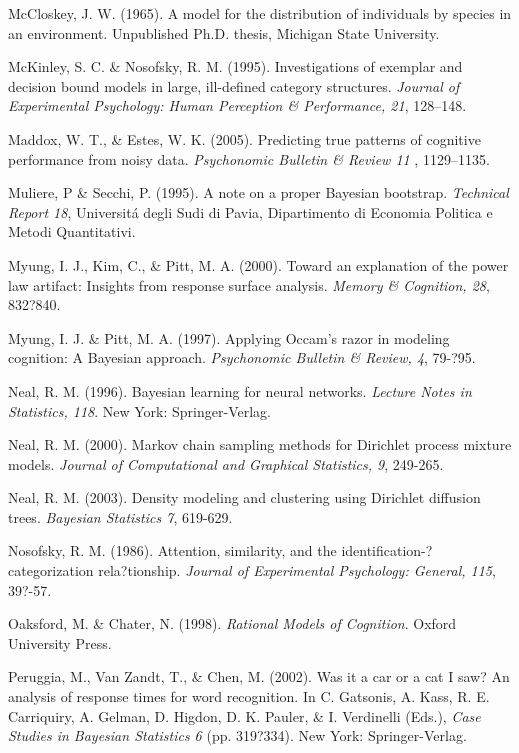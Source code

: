 \documentclass[authoryear]{elsarticle}
\begin{document}
\begin{list}{}{\setlength{\leftmargin}{12pt}\setlength{\itemindent}{-12pt}\setlength{\parsep}{0pt}}
\item McCloskey, J. W. (1965). A model for the distribution of individuals by species in an environment. Unpublished Ph.D. thesis, Michigan State University.
\item McKinley, S. C. \& Nosofsky, R. M. (1995). Investigations of exemplar and decision bound models in large, ill-defined category structures. {\it Journal of Experimental Psychology: Human Perception \& Performance, 21}, 128--148.
\item Maddox, W. T., \& Estes, W. K. (2005). Predicting true patterns of cognitive performance from noisy data. {\it Psychonomic Bulletin \& Review 11} , 1129--1135.
\item Muliere, P \& Secchi, P. (1995). A note on a proper Bayesian bootstrap. {\it Technical Report 18}, Universit\'{a} degli Sudi di Pavia, Dipartimento di Economia Politica e Metodi Quantitativi.
\item Myung, I. J., Kim, C., \& Pitt, M. A. (2000). Toward an explanation of the power law artifact: Insights from response surface analysis. {\it Memory \& Cognition, 28}, 832?840.
\item Myung, I. J. \& Pitt, M. A. (1997). Applying Occam's razor in modeling cognition: A Bayesian approach. {\it Psychonomic Bulletin \& Review, 4}, 79-?95.
\item Neal, R. M. (1996). Bayesian learning for neural networks. {\it Lecture Notes in Statistics, 118}. New York: Springer-Verlag.
\item Neal, R. M. (2000). Markov chain sampling methods for Dirichlet process mixture models. {\it Journal of Computational and Graphical Statistics, 9}, 249-265.
\item Neal, R. M. (2003). Density modeling and clustering using Dirichlet diffusion trees. {\it Bayesian Statistics 7}, 619-629.
\item Nosofsky, R. M. (1986). Attention, similarity, and the identification-?categorization rela?tionship. {\it Journal of Experimental Psychology: General, 115}, 39?-57.
\item Oaksford, M. \& Chater, N. (1998). {\it Rational Models of Cognition}. Oxford University Press.
\item Peruggia, M., Van Zandt, T., \& Chen, M. (2002). Was it a car or a cat I saw? An analysis of response times for word recognition. In C. Gatsonis, A. Kass, R. E. Carriquiry, A. Gelman, D. Higdon, D. K. Pauler, \& I. Verdinelli (Eds.), {\it Case Studies in Bayesian Statistics 6} (pp. 319?334). New York:  Springer-Verlag.

\end{list}
\end{document}
